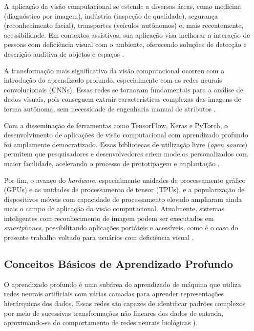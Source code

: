 A aplicação da visão computacional se estende a diversas áreas, como medicina (diagnóstico por imagem), indústria (inspeção de qualidade), segurança (reconhecimento facial), transportes (veículos autônomos) e, mais recentemente, acessibilidade. Em contextos assistivos, sua aplicação visa melhorar a interação de pessoas com deficiência visual com o ambiente, oferecendo soluções de detecção e descrição auditiva de objetos e espaços \cite{goodfellow2016}.

A transformação mais significativa da visão computacional ocorreu com a introdução do aprendizado profundo, especialmente com as redes neurais convolucionais (CNNs). Essas redes se tornaram fundamentais para a análise de dados visuais, pois conseguem extrair características complexas das imagens de forma autônoma, sem necessidade de engenharia manual de atributos \cite{gu2018}.

Com a disseminação de ferramentas como TensorFlow, Keras e PyTorch, o desenvolvimento de aplicações de visão computacional com aprendizado profundo foi amplamente democratizado. Essas bibliotecas de utilização livre (\textit{open source}) permitem que pesquisadores e desenvolvedores criem modelos personalizados com maior facilidade, acelerando o processo de prototipagem e implantação \cite{hassaballah2020}.

Por fim, o avanço do \textit{hardware}, especialmente unidades de processamento gráfico (GPUs) e as unidades de processamento de tensor (TPUs), e a popularização de dispositivos móveis com capacidade de processamento elevado ampliaram ainda mais o campo de aplicação da visão computacional. Atualmente, sistemas inteligentes com reconhecimento de imagem podem ser executados em \textit{smartphones}, possibilitando aplicações portáteis e acessíveis, como é o caso do presente trabalho voltado para usuários com deficiência visual \cite{geron2022}.

\subsection{\textbf{Conceitos Básicos de Aprendizado Profundo}}

O aprendizado profundo é uma subárea do aprendizado de máquina que utiliza redes neurais artificiais com várias camadas para aprender representações hierárquicas dos dados. Essas redes são capazes de identificar padrões complexos por meio de sucessivas transformações não lineares dos dados de entrada, aproximando-se do comportamento de redes neurais biológicas \cite{goodfellow2016}).

